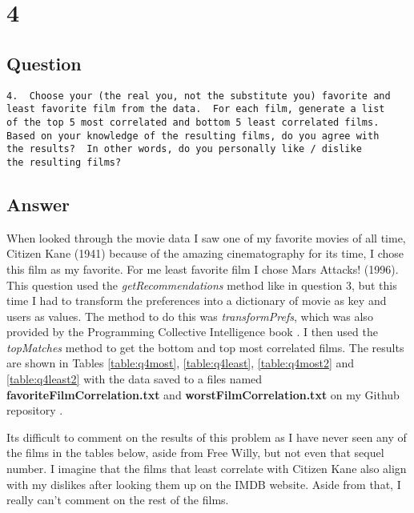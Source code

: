 \documentclass[letterpaper,11pt]{article}
\begin{document}
\clearpage


\section*{4}

\subsection*{Question}

\begin{verbatim}
4.  Choose your (the real you, not the substitute you) favorite and
least favorite film from the data.  For each film, generate a list
of the top 5 most correlated and bottom 5 least correlated films.
Based on your knowledge of the resulting films, do you agree with
the results?  In other words, do you personally like / dislike
the resulting films?
\end{verbatim}

\subsection*{Answer}

When looked through the movie data I saw one of my favorite movies of all time, Citizen Kane (1941) because of the amazing cinematography for its time, I chose this film as my favorite. For me least favorite film I chose Mars Attacks! (1996). This question used the \textit{getRecommendations} method like in question 3, but this time I had to transform the preferences into a dictionary of movie as key and users as values. The method to do this was \textit{transformPrefs}, which was also provided by the Programming Collective Intelligence book \cite{collectiveIntell}. I then used the \textit{topMatches} method to get the bottom and top most correlated films. The results are shown in Tables \ref{table:q4most}, \ref{table:q4least}, \ref{table:q4most2} and \ref{table:q4least2} with the data saved to a files named \textbf{favoriteFilmCorrelation.txt} and \textbf{worstFilmCorrelation.txt} on my Github repository \cite{github}.

Its difficult to comment on the results of this problem as I have never seen any of the films in the tables below, aside from Free Willy, but not even that sequel number. I imagine that the films that least correlate with Citizen Kane also align with my dislikes after looking them up on the IMDB website. Aside from that, I really can't comment on the rest of the films.
\end{document}
